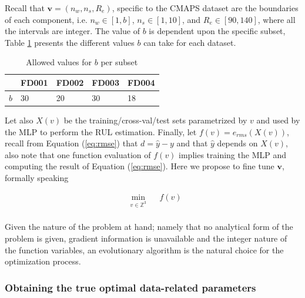 \documentclass{article}
\begin{document}
Recall that $\mathbf{v} = (n_w, n_s, R_e)$, specific to the CMAPS dataset are the boundaries of each component, i.e. $n_w \in \left[1, b\right]$, $n_s \in \left[1, 10\right]$, and $R_e \in \left[90, 140 \right]$, where all the intervals are integer. The value of $b$ is dependent upon the specific subset, Table \ref{table:b_values} presents the different values $b$ can take for each dataset.

\begin{table}[!htb]
\centering
\begin{tabular}{l | l l l l}
	\hline
	 & FD001 & FD002 & FD003 & FD004\\
  	\hline
  	$b$ & 30 & 20 & 30 & 18\\
  	\hline
\end{tabular}
\caption{Allowed values for $b$ per subset}
\label{table:b_values}
\end{table}

Let also $X(v)$ be the training/cross-val/test sets parametrized by $v$ and used by the MLP to perform the RUL estimation. Finally, let $f(v)=e_{rms}(X(v))$, recall from Equation (\ref{eq:rmse}) that $d = \hat{y} - y$ and that $\hat{y}$ depends on $X(v)$, also note that one function evaluation of $f(v)$ implies training the MLP and computing the result of Equation (\ref{eq:rmse}). Here we propose to fine tune $\mathbf{v}$, formally speaking

\begin{equation}
\begin{aligned}
& \underset{v \in \mathbb{Z}^3}{\text{min}}
& & f(v) \\
\end{aligned}
\label{eq:optimization_problem}
\end{equation}

Given the nature of the problem at hand; namely that no analytical form of the problem is given, gradient information is unavailable and the integer nature of the function variables, an evolutionary algorithm is the natural choice for the optimization process.

\subsubsection{Obtaining the true optimal data-related parameters}
\end{document}
